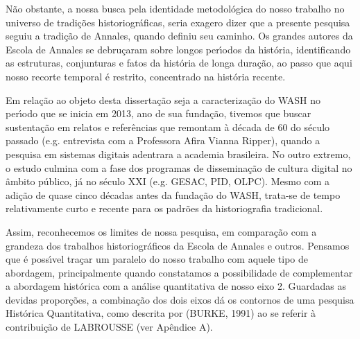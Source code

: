 \documentclass[
12pt,		%
openright,	%
twoside,  %
a4paper,			%
chapter=TITLE,		%
english,			%
french,				%
spanish,			%
brazil				%
]{USPSC-classe/USPSC}
\begin{document}
N\~ao obstante, a nossa busca pela identidade metodol\'ogica do nosso trabalho no universo de tradi\c{c}\~oes historiogr\'aficas, seria exagero dizer que a presente pesquisa seguiu a tradi\c{c}\~ao de Annales, quando definiu seu caminho. Os grandes autores da Escola de Annales se debru\c{c}aram sobre longos per\'{\i}odos da hist\'oria, identificando as estruturas, conjunturas e fatos da \textquotedbl hist\'oria de longa dura\c{c}\~ao\textquotedbl , ao passo que aqui nosso recorte temporal \'e restrito, concentrado na hist\'oria recente.

















Em rela\c{c}\~ao ao objeto desta disserta\c{c}\~ao seja a caracteriza\c{c}\~ao do WASH no per\'{\i}odo que se inicia em 2013, ano de sua funda\c{c}\~ao, tivemos que buscar sustenta\c{c}\~ao em relatos e refer\^encias que remontam \`a d\'ecada de 60 do s\'eculo passado (e.g. entrevista com a Professora Afira Vianna Ripper), quando a pesquisa em sistemas digitais adentrara a academia brasileira. No outro extremo, o estudo culmina com a fase dos programas de dissemina\c{c}\~ao de cultura digital no \^ambito p\'ublico, j\'a no s\'eculo XXI (e.g. GESAC, PID, OLPC).  Mesmo com a adi\c{c}\~ao de quase cinco d\'ecadas antes da funda\c{c}\~ao do WASH, trata-se de tempo relativamente curto e recente para os padr\~oes da historiografia tradicional.

















Assim, reconhecemos os limites de nossa pesquisa, em compara\c{c}\~ao com a grandeza dos trabalhos historiogr\'aficos da Escola de Annales e outros. Pensamos que \'e poss\'{\i}vel tra\c{c}ar um paralelo do nosso trabalho com aquele tipo de abordagem, principalmente quando constatamos a possibilidade de complementar a abordagem hist\'orica com a an\'alise quantitativa de nosso eixo 2. Guardadas as devidas propor\c{c}\~oes, a combina\c{c}\~ao dos dois eixos d\'a os contornos de uma pesquisa Hist\'orica Quantitativa, como descrita por (BURKE, 1991) ao se referir \`a contribui\c{c}\~ao de LABROUSSE (ver Ap\^endice A).
\end{document}
